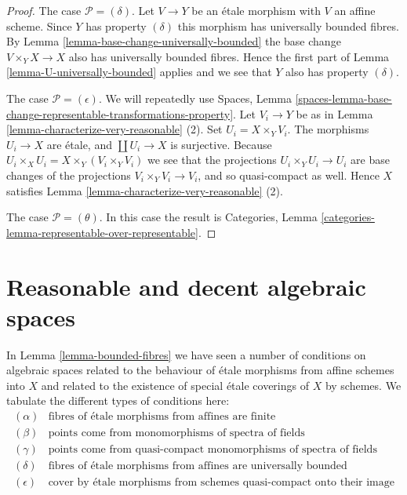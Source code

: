 \begin{proof}
\medskip\noindent
The case $\mathcal{P} = (\delta)$. Let $V \to Y$ be an \'etale morphism with
$V$ an affine scheme. Since $Y$ has property $(\delta)$ this morphism has
universally bounded fibres. By
Lemma \ref{lemma-base-change-universally-bounded}
the base change $V \times_Y X \to X$ also has universally bounded fibres.
Hence the first part of
Lemma \ref{lemma-U-universally-bounded}
applies and we see that $Y$ also has property $(\delta)$.

\medskip\noindent
The case $\mathcal{P} = (\epsilon)$. We will repeatedly use
Spaces, Lemma
\ref{spaces-lemma-base-change-representable-transformations-property}.
Let $V_i \to Y$ be as in
Lemma \ref{lemma-characterize-very-reasonable} (2).
Set $U_i = X \times_Y V_i$. The morphisms $U_i \to X$ are \'etale,
and $\coprod U_i \to X$ is surjective. Because
$U_i \times_X U_i = X \times_Y (V_i \times_Y V_i)$ we see
that the projections $U_i \times_Y U_i \to U_i$ are
base changes of the projections $V_i \times_Y V_i \to V_i$, and so
quasi-compact as well. Hence $X$ satisfies
Lemma \ref{lemma-characterize-very-reasonable} (2).

\medskip\noindent
The case $\mathcal{P} = (\theta)$. In this case the result is
Categories, Lemma \ref{categories-lemma-representable-over-representable}.
\end{proof}











\section{Reasonable and decent algebraic spaces}
\label{section-reasonable-decent}

\noindent
In
Lemma \ref{lemma-bounded-fibres}
we have seen a number of conditions on algebraic spaces related to
the behaviour of \'etale morphisms from affine schemes into $X$
and related to the existence of special \'etale coverings of $X$ by
schemes. We tabulate the different types of conditions here:
$$
\boxed{
\begin{matrix}
(\alpha) & \text{fibres of \'etale morphisms from affines are finite} \\
(\beta) & \text{points come from monomorphisms of spectra of fields} \\
(\gamma) & \text{points come from quasi-compact monomorphisms of
spectra of fields} \\
(\delta) & \text{fibres of \'etale morphisms from affines are universally
bounded} \\
(\epsilon) & \text{cover by \'etale morphisms from schemes quasi-compact
onto their image}
\end{matrix}
}
$$

